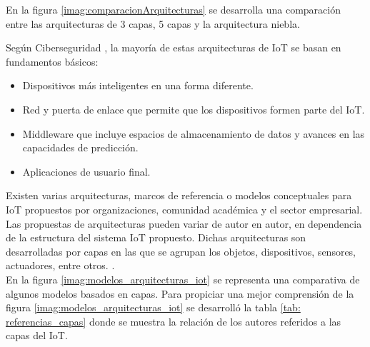     En la figura \ref{imag:comparacionArquitecturas} se desarrolla una comparación entre las arquitecturas de 3 capas, 5 capas y la arquitectura niebla.

    Según Ciberseguridad \cite{capasIoTciberseguridad}, la mayoría de estas arquitecturas de IoT se basan en fundamentos básicos:
    \begin{itemize}
        \item Dispositivos más inteligentes en una forma diferente.
        \item Red y puerta de enlace que permite que los dispositivos formen parte del IoT.
        \item Middleware que incluye espacios de almacenamiento de datos y avances en las capacidades de predicción.
        \item Aplicaciones de usuario final.
    \end{itemize}

    Existen varias arquitecturas, marcos de referencia o modelos conceptuales para IoT propuestos por organizaciones, comunidad académica y el sector empresarial. Las propuestas de arquitecturas pueden variar de autor en autor, en dependencia de la estructura del sistema IoT propuesto. Dichas arquitecturas son desarrolladas por capas en las que se agrupan los objetos, dispositivos, sensores, actuadores, entre otros. \cite{internetOfThingsStateOfTheArt} \cite{capasIoTciberseguridad}.\\

    En la figura \ref{imag:modelos_arquitecturas_iot} se representa una comparativa de algunos modelos basados en capas. Para propiciar una mejor comprensión de la figura \ref{imag:modelos_arquitecturas_iot} se desarrolló la tabla \ref{tab: referencias_capas} donde se muestra la relación de los autores referidos a las capas del IoT.

